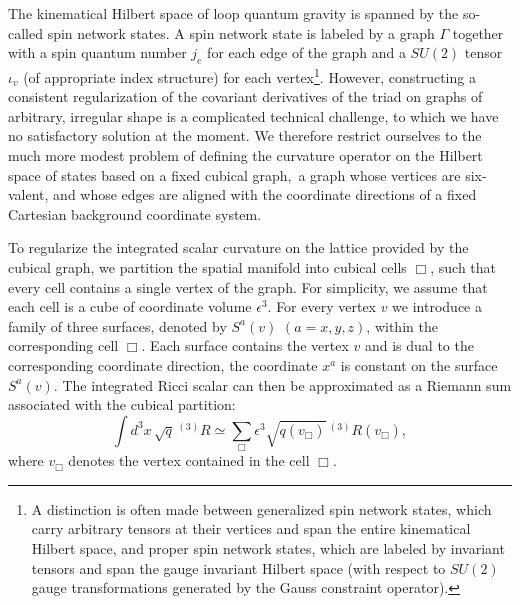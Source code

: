 \documentclass{appolb_edited}
\newcommand{\Rt}{\,{}^{(3)}\!R}
\begin{document}
The kinematical Hilbert space of loop quantum gravity is spanned by the so-called spin network states. A spin network state is labeled by a graph $\Gamma$ together with a spin quantum number $j_e$ for each edge of the graph and a $SU(2)$ tensor $\iota_v$ (of appropriate index structure) for each vertex\footnote{
	A distinction is often made between generalized spin network states, which carry arbitrary tensors at their vertices and span the entire kinematical Hilbert space, and proper spin network states, which are labeled by invariant tensors and span the gauge invariant Hilbert space (with respect to $SU(2)$ gauge transformations generated by the Gauss constraint operator).
}.
However, constructing a consistent regularization of the covariant derivatives of the triad on graphs of arbitrary, irregular shape is a complicated technical challenge, to which we have no satisfactory solution at the moment. We therefore restrict ourselves to the much more modest problem of defining the curvature operator on the Hilbert space of states based on a fixed cubical graph, \ie a graph whose vertices are six-valent, and whose edges are aligned with the coordinate directions of a fixed Cartesian background coordinate system.

To regularize the integrated scalar curvature on the lattice provided by the cubical graph, we partition the spatial manifold into cubical cells $\Box$, such that every cell contains a single vertex of the graph. For simplicity, we assume that each cell is a cube of coordinate volume $\epsilon^3$. For every vertex $v$ we introduce a family of three surfaces, denoted by $S^a(v)$ $(a = x, y, z)$, within the corresponding cell $\Box$. Each surface contains the vertex $v$ and is dual to the corresponding coordinate direction, \ie the coordinate $x^a$ is constant on the surface $S^a(v)$. The integrated Ricci scalar can then be approximated as a Riemann sum associated with the cubical partition:
\begin{equation}
	\int d^3x\,\sqrt q\Rt \simeq \sum_{\Box} \epsilon^3 \sqrt{q(v_\Box)}\Rt(v_\Box),
	\label{sum R}
\end{equation}
where $v_\Box$ denotes the vertex contained in the cell $\Box$.
\end{document}
